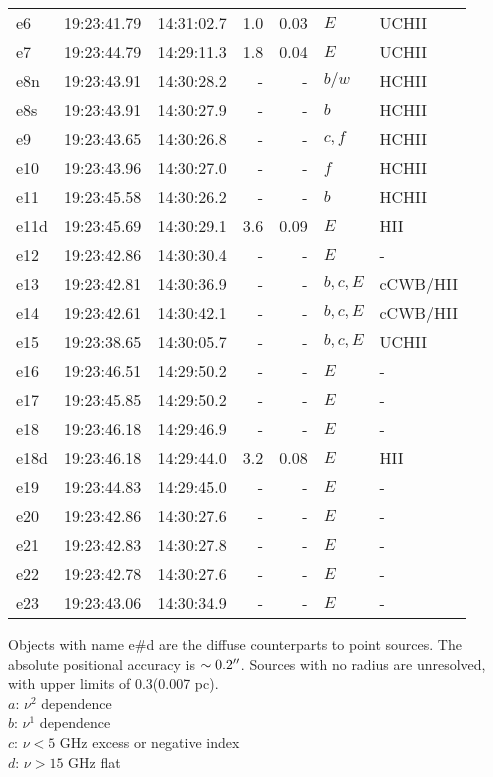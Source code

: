 \begin{table*}[htp]
\begin{tabular}{lllrrll}
e6 & 19:23:41.79 & 14:31:02.7 & 1.0 & 0.03 & $E$ & UCHII \\
e7 & 19:23:44.79 & 14:29:11.3 & 1.8 & 0.04 & $E$ & UCHII \\
e8n & 19:23:43.91 & 14:30:28.2 & - & - & $b/w$ & HCHII \\
e8s & 19:23:43.91 & 14:30:27.9 & - & - & $b$ & HCHII \\
e9 & 19:23:43.65 & 14:30:26.8 & - & - & $c,f$ & HCHII \\
e10 & 19:23:43.96 & 14:30:27.0 & - & - & $f$ & HCHII \\
e11 & 19:23:45.58 & 14:30:26.2 & - & - & $b$ & HCHII \\
e11d & 19:23:45.69 & 14:30:29.1 & 3.6 & 0.09 & $E$ & HII \\
e12 & 19:23:42.86 & 14:30:30.4 & - & - & $E$ & - \\
e13 & 19:23:42.81 & 14:30:36.9 & - & - & $b,c,E$ & cCWB/HII \\
e14 & 19:23:42.61 & 14:30:42.1 & - & - & $b,c,E$ & cCWB/HII \\
e15 & 19:23:38.65 & 14:30:05.7 & - & - & $b,c,E$ & UCHII \\
e16 & 19:23:46.51 & 14:29:50.2 & - & - & $E$ & - \\
e17 & 19:23:45.85 & 14:29:50.2 & - & - & $E$ & - \\
e18 & 19:23:46.18 & 14:29:46.9 & - & - & $E$ & - \\
e18d & 19:23:46.18 & 14:29:44.0 & 3.2 & 0.08 & $E$ & HII \\
e19 & 19:23:44.83 & 14:29:45.0 & - & - & $E$ & - \\
e20 & 19:23:42.86 & 14:30:27.6 & - & - & $E$ & - \\
e21 & 19:23:42.83 & 14:30:27.8 & - & - & $E$ & - \\
e22 & 19:23:42.78 & 14:30:27.6 & - & - & $E$ & - \\
e23 & 19:23:43.06 & 14:30:34.9 & - & - & $E$ & - \\
\hline
\end{tabular}
\par
Objects with name e\#d are the diffuse counterparts to point sources.  The absolute positional accuracy is $\sim0.2\mbox{$^{\prime\prime}$}$.  Sources with no radius are unresolved, with upper limits of 0.3\arcsec (0.007 pc).\\
$a$: $\nu^2$ dependence \\
$b$: $\nu^1$ dependence \\
$c$: $\nu<5$ GHz excess or negative index \\
$d$: $\nu>15$ GHz flat \\

\end{table*}
